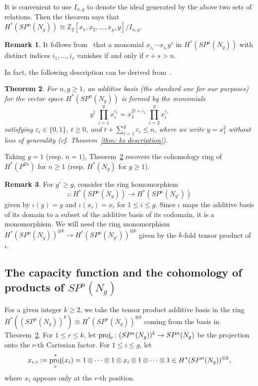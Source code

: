 \documentclass[amscd,amssymb,verbatim,10pt]{amsart}
\numberwithin{equation}{section}
\theoremstyle{plain}
\newtheorem{thm}{Theorem}[section]
\theoremstyle{definition}
\newtheorem{remark}[thm]{Remark}
\DeclareMathOperator{\proj}{{\textup{proj}}}
\def\Z{{\mathbb Z}}
\begin{document}
It is convenient to use $I_{n,g}$ to denote the ideal generated by the above two sets of relations. Then the theorem says that $H^*(SP^n(N_g))\cong\Z_2\left[x_1,x_2,\ldots,x_g,y\right]/I_{n,g}$.

\begin{remark}\label{rem: ks non-zero}
It follows from~\cite[Lemma 19]{KS} that a monomial $x_{i_1}\cdots x_{i_r}y^s$ in $H^*(SP^n(N_g))$ with distinct indices $i_1,\ldots,i_r$ vanishes if and only if $r+s>n$. 
\end{remark}

In fact, the following description can be derived from~\cite[Theorem~6]{KS}.


\begin{thm}\label{thm: additive basis}
For $n,g\ge 1$, an additive basis (the standard one for our purposes) for the vector space $H^*(SP^n(N_g))$ is formed by the monomials
\[
y^{t}\ \prod_{i=1}^gx_{i}^{\varepsilon_i} = x_1^{2t+\varepsilon_1}\ \prod_{i=2}^gx_{i}^{\varepsilon_i}
\]
satisfying $\varepsilon_i\in\{0,1\}$, $t\ge 0$, and $t+\sum_{i=1}^g\varepsilon_i\le n$, where we write $y=x_1^2$ without loss of generality (cf. Theorem~\ref{thm: ks description}).
\end{thm}

Taking $g=1$ (resp. $n=1$), Theorem~\ref{thm: additive basis} recovers the cohomology ring of $H^*(P^{2n})$ for $n\ge 1$ (resp. $H^*(N_g)$ for $g\ge 1$).

\begin{remark}\label{rem: relocatedcontent}
For $g'\ge g$, consider the ring homomorphism
\[
\iota\colon H^*(SP^n(N_g))\to H^*(SP^n(N_{g'}))
\]
given by $\iota(y)=y$ and $\iota(x_i)=x_i$ for $1\le i \le g$. Since $\iota$ maps the additive basis of its domain to a subset of the additive basis of its codomain, it is a monomorphism. We will need the ring monomorphism $H^*(SP^n(N_g))^{\otimes k}\to H^*(SP^n(N_{g'}))^{\otimes k}$ given by the $k$-fold tensor product of $\iota$.
\end{remark}

\subsection{The capacity function and the cohomology of products of $SP^n(N_g)$}\label{subsec: coho ring2}
For a given integer $k\ge 2$, we take the tensor product additive basis in the ring $H^*((SP^n(N_g))^k)\cong H^*(SP^n(N_g))^{\otimes k}$ coming from the basis in Theorem~\ref{thm: additive basis}. For $1\le r\le k$, let $\proj_r\colon (SP^n(N_g))^k \to SP^n(N_g)$ be the projection onto the $r$-th Cartesian factor. For $1\le i \le g$, let
\begin{equation}\label{defintionofxri}
x_{r,i}:=\proj_r^*(x_i) = 1\otimes\cdots\otimes 1 \otimes x_i\otimes 1\otimes\cdots\otimes 1 \in H^*(SP^n(N_g))^{\otimes k},
\end{equation}
where $x_i$ appears only at the $r$-th position.
\end{document}
